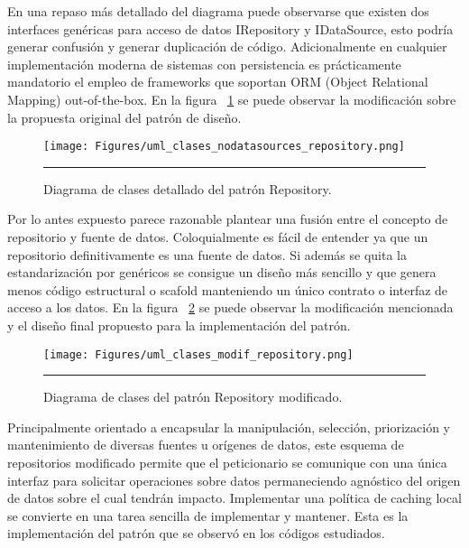 En una repaso más detallado del diagrama puede observarse que existen dos interfaces genéricas para acceso de datos IRepository y IDataSource, esto podría generar confusión y generar duplicación de código. Adicionalmente en cualquier implementación moderna de sistemas con persistencia es prácticamente mandatorio el empleo de frameworks que soportan ORM (Object Relational Mapping) out-of-the-box.
En la figura ~\ref{fig:uml_clases_detalles_repository} se puede observar la modificación sobre la propuesta original del patrón de diseño.

\begin{figure}[htbp]
	\centering
	\texttt{[image: Figures/uml\_clases\_nodatasources\_repository.png]}
	\rule{35em}{1pt}
	\caption[Repository Pattern Detailed Class Diagram]{Diagrama de clases detallado del patrón Repository.}
	\label{fig:uml_clases_detalles_repository}
\end{figure}

Por lo antes expuesto parece razonable plantear una fusión entre el concepto de repositorio y fuente de datos. Coloquialmente es fácil de entender ya que un repositorio definitivamente es una fuente de datos. Si además se quita la estandarización por genéricos se consigue un diseño más sencillo y que genera menos código estructural o scafold manteniendo un único contrato o interfaz de acceso a los datos. En la figura ~\ref{fig:uml_clases_modif_repository} se puede observar la modificación mencionada y el diseño final propuesto para la implementación del patrón.


\begin{figure}[htbp]
	\centering
	\texttt{[image: Figures/uml\_clases\_modif\_repository.png]}
	\rule{35em}{1pt}
	\caption[Modified Repository Pattern Class Diagram]{Diagrama de clases del patrón Repository modificado.}
	\label{fig:uml_clases_modif_repository}
\end{figure}

Principalmente orientado a encapsular la manipulación, selección, priorización y mantenimiento de diversas fuentes u orígenes de datos, este esquema de repositorios modificado permite que el peticionario se comunique con una única interfaz para solicitar operaciones sobre datos permaneciendo agnóstico del origen de datos sobre el cual tendrán impacto. 
Implementar una política de caching local se convierte en una tarea sencilla de implementar y mantener.
Esta es la implementación del patrón que se observó en los códigos estudiados.

